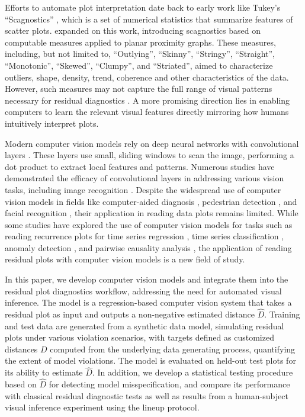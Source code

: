 \documentclass[]{interact}
\theoremstyle{plain}%
\theoremstyle{definition}
\theoremstyle{remark}
\begin{document}
Efforts to automate plot interpretation date back to early work like
Tukey's ``Scagnostics'' \citep{tukey1985computer}, which is a set of
numerical statistics that summarize features of scatter plots.
\citet{wilkinson2005graph} expanded on this work, introducing
scagnostics based on computable measures applied to planar proximity
graphs. These measures, including, but not limited to, ``Outlying'',
``Skinny'', ``Stringy'', ``Straight'', ``Monotonic'', ``Skewed'',
``Clumpy'', and ``Striated'', aimed to characterize outliers, shape,
density, trend, coherence and other characteristics of the data.
However, such measures may not capture the full range of visual patterns
necessary for residual diagnostics \citep{buja2009statistical}. A more
promising direction lies in enabling computers to learn the relevant
visual features directly mirroring how humans intuitively interpret
plots.

Modern computer vision models rely on deep neural networks with
convolutional layers \citep{fukushima1982neocognitron}. These layers use
small, sliding windows to scan the image, performing a dot product to
extract local features and patterns. Numerous studies have demonstrated
the efficacy of convolutional layers in addressing various vision tasks,
including image recognition \citep{rawat2017deep}. Despite the
widespread use of computer vision models in fields like computer-aided
diagnosis \citep{lee2015image}, pedestrian detection
\citep{brunetti2018computer}, and facial recognition
\citep{emami2012facial}, their application in reading data plots remains
limited. While some studies have explored the use of computer vision
models for tasks such as reading recurrence plots for time series
regression \citep{ojeda2020multivariate}, time series classification
\citep{chu2019automatic, hailesilassie2019financial, hatami2018classification, zhang2020encoding},
anomaly detection \citep{chen2020convolutional}, and pairwise causality
analysis \citep{singh2017deep}, the application of reading residual
plots with computer vision models is a new field of study.

In this paper, we develop computer vision models and integrate them into
the residual plot diagnostics workflow, addressing the need for
automated visual inference. The model is a regression-based computer
vision system that takes a residual plot as input and outputs a
non-negative estimated distance \(\hat{D}\). Training and test data are
generated from a synthetic data model, simulating residual plots under
various violation scenarios, with targets defined as customized
distances \(D\) computed from the underlying data generating process,
quantifying the extent of model violations. The model is evaluated on
held-out test plots for its ability to estimate \(\hat{D}\). In
addition, we develop a statistical testing procedure based on
\(\hat{D}\) for detecting model misspecification, and compare its
performance with classical residual diagnostic tests as well as results
from a human-subject visual inference experiment using the lineup
protocol.
\end{document}
